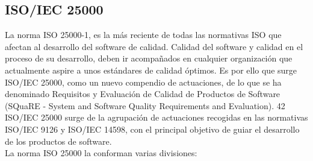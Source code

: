 \documentclass[preprint,12pt]{elsarticle}
\begin{document}
	\subsection{\textbf{ISO/IEC 25000}}
	La norma ISO 25000-1, es la más reciente de todas las normativas ISO que afectan al desarrollo del software de calidad. Calidad del software y calidad en el proceso de su desarrollo, deben ir acompañados en cualquier organización que actualmente aspire a unos estándares de calidad óptimos. Es por ello que surge ISO/IEC 25000, como un nuevo compendio de actuaciones, de lo que se ha denominado Requisitos y Evaluación de Calidad de Productos de Software (SQuaRE - System and Software Quality Requirements and Evaluation). 42 ISO/IEC 25000 surge de la agrupación de actuaciones recogidas en las normativas ISO/IEC 9126 y ISO/IEC 14598, con el principal objetivo de guiar el desarrollo de los productos de software.
\\
La norma ISO 25000 la conforman varias divisiones: 
\end{document}
